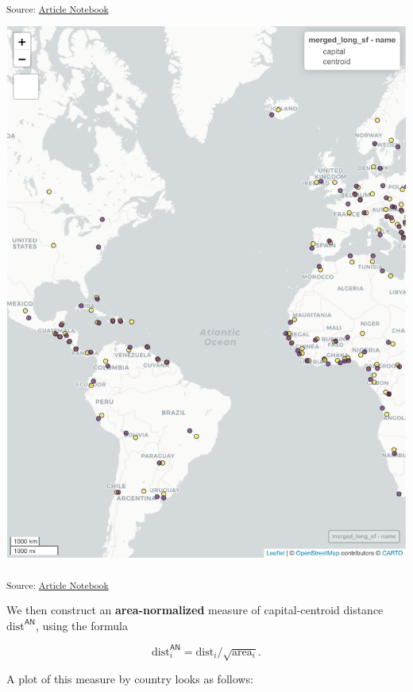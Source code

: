 \documentclass[
  letterpaper,
  DIV=11,
  numbers=noendperiod]{scrartcl}
\begin{document}
\textsubscript{Source:
\href{https://jpowerj.github.io/gis-manuscript-template/index.qmd.html}{Article
Notebook}}

\includegraphics{index_files/figure-pdf/load-eda-1.pdf}

\textsubscript{Source:
\href{https://jpowerj.github.io/gis-manuscript-template/index.qmd.html}{Article
Notebook}}

We then construct an \textbf{area-normalized} measure of
capital-centroid distance \(\text{dist}^{\textsf{AN}}\), using the
formula

\[
\text{dist}^{\textsf{AN}}_i = \text{dist}_i / \sqrt{\text{area}_i}.
\]

A plot of this measure by country looks as follows:
\end{document}
